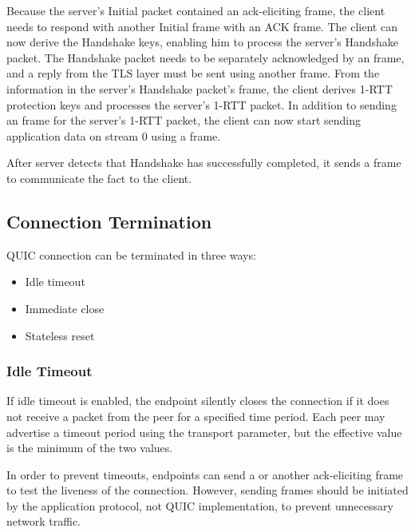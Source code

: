 Because the server's Initial packet contained an ack-eliciting \CRYPTO{} frame, the client needs to
respond with another Initial frame with an ACK frame. The client can now derive the Handshake keys,
enabling him to process the server's Handshake packet. The Handshake packet needs to be separately
acknowledged by an \ACK{} frame, and a reply from the TLS layer must be sent using another \CRYPTO{}
frame. From the information in the server's Handshake packet's \CRYPTO{} frame, the client derives
1-RTT protection keys and processes the server's 1-RTT packet. In addition to sending an \ACK{}
frame for the server's 1-RTT packet, the client can now start sending application data on stream 0
using a \STREAM{} frame.

After server detects that Handshake has successfully completed, it sends a \HANDSHAKEDONE{} frame to
communicate the fact to the client.

\subsection{Connection Termination}

QUIC connection can be terminated in three ways:

\begin{itemize}

  \item Idle timeout

  \item Immediate close

  \item Stateless reset

\end{itemize}

\subsubsection{Idle Timeout}\label{sec:idle-timeout}

If idle timeout is enabled, the endpoint silently closes the connection if it does not receive a
packet from the peer for a specified time period. Each peer may advertise a timeout period using the
\MaxIdleTimeout{} transport parameter, but the effective value is the minimum of the two
values.

In order to prevent timeouts, endpoints can send a \PING{} or another ack-eliciting frame to test
the liveness of the connection. However, sending \PING{} frames should be initiated by the
application protocol, not QUIC implementation, to prevent unnecessary network traffic.

